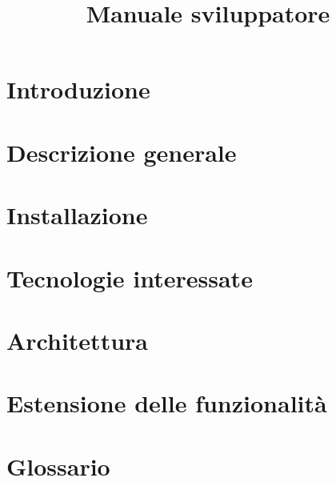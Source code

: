 \documentclass{article}
\title{Manuale sviluppatore}
\begin{document}


\section{Introduzione}%
\label{sec:introduzione}


\newpage
\section{Descrizione generale}%
\label{sec:descrizione_generale}


\newpage
\section{Installazione}%
\label{sec:installazione}


\newpage
\section{Tecnologie interessate}%
\label{sec:tecnologie_interessate}

\newpage
\section{Architettura}%
\label{sec:architettura}


\newpage
\section{Estensione delle funzionalità}%
\label{sec:estensione_funzionalita}


\newpage
\appendix
\section{Glossario}%
\label{sec:glossario}

\end{document}
